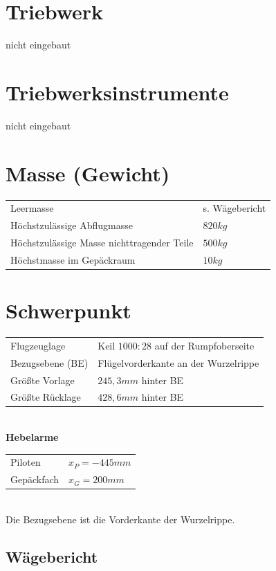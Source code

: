 \section{Triebwerk}
nicht eingebaut
\newpage
\section{Triebwerksinstrumente}
nicht eingebaut
\newpage
\section{Masse (Gewicht)}
\begin{tabular}{l l}
Leermasse & s. Wägebericht\\
Höchstzulässige Abflugmasse & $820kg$\\
Höchstzulässige Masse nichttragender Teile & $500kg$ \\
Höchstmasse im Gepäckraum & $10kg$ \\

\end{tabular}

\section{Schwerpunkt}
\begin{tabular}{l l}
Flugzeuglage & Keil $1000:28$ auf der Rumpfoberseite\\
Bezugsebene (BE) & Flügelvorderkante an der Wurzelrippe \\
Größte Vorlage & $245,3mm$ hinter BE\\
Größte Rücklage & $428,6mm$ hinter BE\\
\end{tabular}\\
\newline
\textbf{Hebelarme}\\
\begin{tabular}{m{} m{3cm}}
Piloten & $x_P=-445mm$\\
Gepäckfach & $x_G=200mm$\\

\end{tabular}\\
\newline
Die Bezugsebene ist die Vorderkante der Wurzelrippe.

\subsection{Wägebericht}

